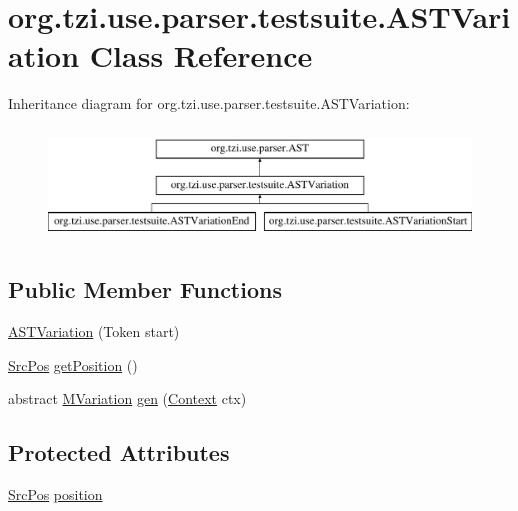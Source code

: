 \hypertarget{classorg_1_1tzi_1_1use_1_1parser_1_1testsuite_1_1_a_s_t_variation}{\section{org.\-tzi.\-use.\-parser.\-testsuite.\-A\-S\-T\-Variation Class Reference}
\label{classorg_1_1tzi_1_1use_1_1parser_1_1testsuite_1_1_a_s_t_variation}
}
Inheritance diagram for org.\-tzi.\-use.\-parser.\-testsuite.\-A\-S\-T\-Variation\-:\begin{figure}[H]
\begin{center}
\leavevmode
\includegraphics[height=3.000000cm]{classorg_1_1tzi_1_1use_1_1parser_1_1testsuite_1_1_a_s_t_variation}
\end{center}
\end{figure}
\subsection*{Public Member Functions}
\begin{DoxyCompactItemize}
\item 
\hyperlink{classorg_1_1tzi_1_1use_1_1parser_1_1testsuite_1_1_a_s_t_variation_a2cd12a934f9243c881e651a5ff24ba67}{A\-S\-T\-Variation} (Token start)
\item 
\hyperlink{classorg_1_1tzi_1_1use_1_1parser_1_1_src_pos}{Src\-Pos} \hyperlink{classorg_1_1tzi_1_1use_1_1parser_1_1testsuite_1_1_a_s_t_variation_afc0df1201034e24a21a8547bb2f37251}{get\-Position} ()
\item 
abstract \hyperlink{classorg_1_1tzi_1_1use_1_1uml_1_1sys_1_1testsuite_1_1_m_variation}{M\-Variation} \hyperlink{classorg_1_1tzi_1_1use_1_1parser_1_1testsuite_1_1_a_s_t_variation_a8a43b738fda4063a9e8b48c3a6294ec1}{gen} (\hyperlink{classorg_1_1tzi_1_1use_1_1parser_1_1_context}{Context} ctx)
\end{DoxyCompactItemize}
\subsection*{Protected Attributes}
\begin{DoxyCompactItemize}
\item 
\hyperlink{classorg_1_1tzi_1_1use_1_1parser_1_1_src_pos}{Src\-Pos} \hyperlink{classorg_1_1tzi_1_1use_1_1parser_1_1testsuite_1_1_a_s_t_variation_a6d7e13c21bfd2f915492912dab1ea5f8}{position}
\end{DoxyCompactItemize}


